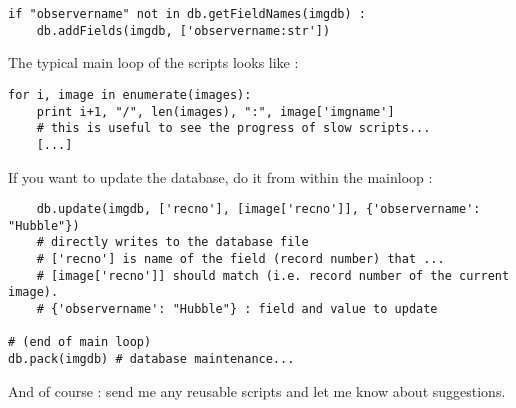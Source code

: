 \begin{lstlisting}
if "observername" not in db.getFieldNames(imgdb) :
	db.addFields(imgdb, ['observername:str'])
\end{lstlisting}

The typical main loop of the scripts looks like :

\begin{lstlisting}
for i, image in enumerate(images):
	print i+1, "/", len(images), ":", image['imgname']
	# this is useful to see the progress of slow scripts...
	[...]

\end{lstlisting}

If you want to update the database, do it from within the mainloop :

\begin{lstlisting}
	db.update(imgdb, ['recno'], [image['recno']], {'observername': "Hubble"})
	# directly writes to the database file
	# ['recno'] is name of the field (record number) that ...
	# [image['recno']] should match (i.e. record number of the current image).
	# {'observername': "Hubble"} : field and value to update

# (end of main loop)
db.pack(imgdb) # database maintenance...

\end{lstlisting}

And of course : send me any reusable scripts and let me know about suggestions.
